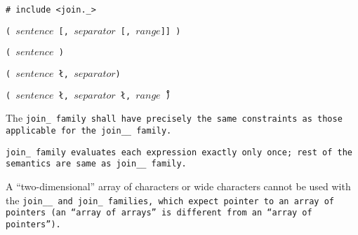 
\tt{# include <join._>}

\s\s\s\tt{(} $sentence$
 [\tt{,} $separator$  [\tt{,} $range$]] \tt{)}

\s\tt{(} $sentence$ \tt{)}

\s\tt{(} $sentence$
\l\tt{,} $separator$\r \tt{)}

\s\tt{(} $sentence$
\l\tt{,} $separator$ \l\tt{,} $range$\r\r\ \tt{)}


The \tt{join_} family shall have precisely the same
constraints as those applicable for the \tt{join__} family.


\tt{join_} family evaluates each expression exactly only once;
rest of the semantics are same as \tt{join__} family.

\note A ``two-dimensional'' array of characters or wide
characters cannot be used with the \tt{join__} and \tt{join_}
families, which expect pointer to an array of pointers
(an ``array of arrays'' is different from an ``array of pointers'').
